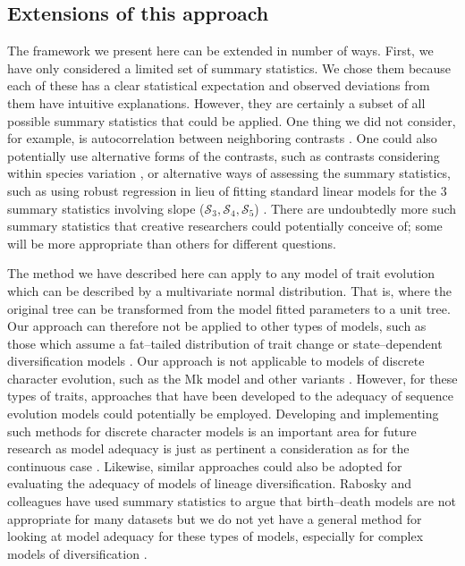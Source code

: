 \documentclass[a4paper,12pt]{article}
\begin{document}
\subsection*{Extensions of this approach}
The framework we present here can be extended in number of ways. First, we have only considered a limited set of summary statistics. We chose them because each of these has a clear statistical expectation and observed deviations from them have intuitive explanations. However, they are certainly a subset of all possible summary statistics that could be applied. One thing we did not consider, for example, is autocorrelation between neighboring contrasts \citep{Gittleman1990}. One could also potentially use alternative forms of the contrasts, such as contrasts considering within species variation \citep{Felsenstein2008}, or alternative ways of assessing the summary statistics, such as using robust regression in lieu of fitting standard linear models for the 3 summary statistics involving slope ($\mathcal{S}_3, \mathcal{S}_4, \mathcal{S}_5$) \citep{SlaterPennell}. There are undoubtedly more such summary statistics that creative researchers could potentially conceive of; some will be more appropriate than others for different questions.

The method we have described here can apply to any model of trait evolution which can be described by a multivariate normal distribution. That is, where the original tree can be transformed from the model fitted parameters to a unit tree. Our approach can therefore not be applied to other types of models, such as those which assume a fat--tailed distribution of trait change \citep{Landis2012} or state--dependent diversification models \citep{Bokma2008, FitzJohn2010}. Our approach is not applicable to models of discrete character evolution, such as the Mk model \citep{Pagel1994} and other variants \citep{Felsenstein2012, Beaulieu2013}. However, for these types of traits, approaches that have been developed to the adequacy of sequence evolution models \citep{Bollback2002, Lewis2013} could potentially be employed. Developing and implementing such methods for discrete character models is an important area for future research as model adequacy is just as pertinent a consideration as for the continuous case \citep{ReadNee1995}. Likewise, similar approaches could also be adopted for evaluating the adequacy of models of lineage diversification. Rabosky and colleagues \citep{Rabosky2009AmNat, Rabosky2012} have used summary statistics to argue that birth--death models \citep{Nee1992, Alfaro2009} are not appropriate for many datasets but we do not yet have a general method for looking at model adequacy for these types of models, especially for complex models of diversification \citep{Stadler2011, Etienne2012PRSB}.
\end{document}
